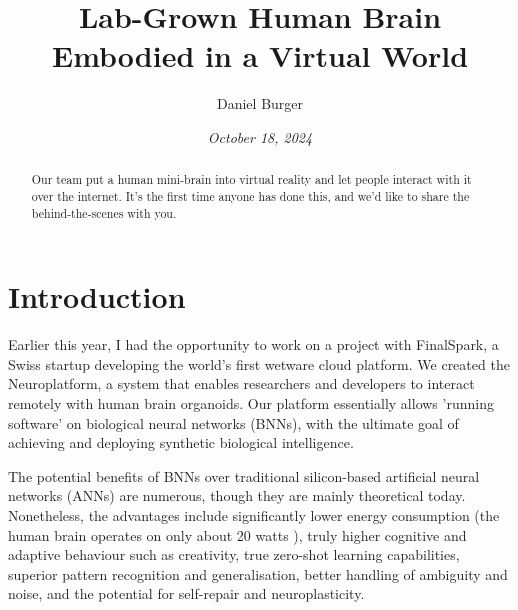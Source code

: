 \documentclass[10pt]{article}
\begin{document}
\setlength{\footskip}{65pt}


\title{\textbf{Lab-Grown Human Brain \\ Embodied in a Virtual World}}
\author[1]{Daniel Burger}
\date{\textit{October 18, 2024}}
\maketitle
\thispagestyle{empty}

\begin{sloppypar}
  \begin{abstract}
    Our team put a human mini-brain into virtual reality and let people interact with it over the internet. It's the first time anyone has done this, and we'd like to share the behind-the-scenes with you.
  \end{abstract}

  \pagebreak
  \tableofcontents
  \pagebreak
  \listoffigures
  \pagebreak
  \listoftables
  \pagebreak
  \lstlistoflistings
  \pagebreak


  \section{Introduction}
  \label{sec:introduction}

  Earlier this year, I had the opportunity to work on a project with FinalSpark, a Swiss startup developing the world's first wetware cloud platform. We created the Neuroplatform, a system that enables researchers and developers to interact remotely with human brain organoids. Our platform essentially allows 'running software' on biological neural networks (BNNs), with the ultimate goal of achieving and deploying synthetic biological intelligence.

  The potential benefits of BNNs over traditional silicon-based artificial neural networks (ANNs) are numerous, though they are mainly theoretical today. Nonetheless, the advantages include significantly lower energy consumption (the human brain operates on only about 20 watts \citep{balasubramanian_brain_2021}), truly higher cognitive and adaptive behaviour such as creativity, true zero-shot learning capabilities, superior pattern recognition and generalisation, better handling of ambiguity and noise, and the potential for self-repair and neuroplasticity.


\end{sloppypar}
\end{document}
